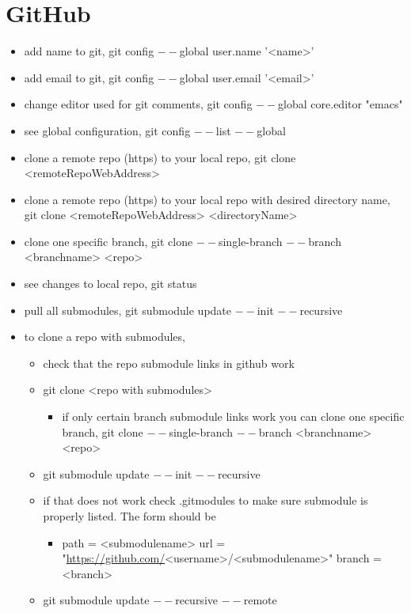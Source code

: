 \documentclass[11pt]{article}
\begin{document}
\section{GitHub}
\label{sec:org0677580}
\begin{itemize}
\item add name to git, git config \(--\)global user.name '<name>'
\item add email to git, git config \(--\)global user.email '<email>'
\item change editor used for git comments, git config \(--\)global core.editor "emacs"
\item see global configuration, git config \(--\)list \(--\)global
\item clone a remote repo (https) to your local repo, git clone <remoteRepoWebAddress>
\item clone a remote repo (https) to your local repo with desired directory name, git clone <remoteRepoWebAddress> <directoryName>
\item clone one specific branch, git clone \(--\)single-branch \(--\)branch <branchname> <repo>
\item see changes to local repo, git status
\item pull all submodules, git submodule update \(--\)init \(--\)recursive
\item to clone a repo with submodules,
\begin{itemize}
\item check that the repo submodule links in github work
\item git clone <repo with submodules>
\begin{itemize}
\item if only certain branch submodule links work you can clone one specific branch, git clone \(--\)single-branch \(--\)branch <branchname> <repo>
\end{itemize}
\item git submodule update \(--\)init \(--\)recursive
\item if that does not work check .gitmodules to make sure submodule is properly listed. The form should be
\begin{itemize}
\item{}
path = <submodulename>
url = "\url{https://github.com/}<username>/<submodulename>"
branch = <branch>
\end{itemize}
\item git submodule update \(--\)recursive \(--\)remote
\begin{itemize}

\end{itemize}
\end{itemize}
\end{itemize}
\end{document}
